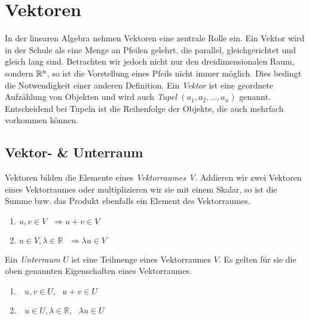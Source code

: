 


%

\section{Vektoren}
In der linearen Algebra nehmen Vektoren eine zentrale Rolle ein. Ein Vektor wird in der Schule als eine Menge an Pfeilen gelehrt, die parallel, gleichgerichtet und gleich lang sind. Betrachten wir jedoch nicht nur den dreidimensionalen Raum, sondern $\mathbb{R}\textsuperscript{n}$, so ist die Vorstellung eines Pfeils nicht immer m\"oglich. Dies bedingt die Notwendigkeit einer anderen Definition.
\newline
\indent Ein \textit{Vektor} ist eine geordnete Aufz\"ahlung von Objekten und wird auch \textit{Tupel} $(a_1, a_2,\dots,a_n)$ genannt. Entscheidend bei Tupeln ist die Reihenfolge der Objekte, die auch mehrfach vorkommen k\"onnen.

\subsection{Vektor- \& Unterraum}
Vektoren bilden die Elemente eines \textit{Vektorraumes V}. Addieren wir zwei Vektoren eines Vektorraumes oder multiplizieren wir sie mit einem Skalar, so ist die Summe bzw. das Produkt ebenfalls ein Element des Vektorraumes.
\vspace{10pt}
\begin{enumerate}
\item $u, v \in V \text{ }\Rightarrow u+v \in V$
\item $u\in V, \lambda \in \mathbb{R} \text{ }\Rightarrow \lambda u \in V$
\end{enumerate}
\vspace{10pt}
Ein \textit{Unterraum} $U$ ist eine Teilmenge eines Vektorraumes $V$. Es gelten f\"ur sie die oben genannten Eigenschaften eines Vektorraumes.
\vspace{10pt}
\begin{enumerate}
\item $\text{ }u, v \in U,\text{ } u+v \in U$
\item $\text{ }u \in U, \lambda \in \mathbb{R} ,\text{ }\lambda u \in U$
\end{enumerate}

